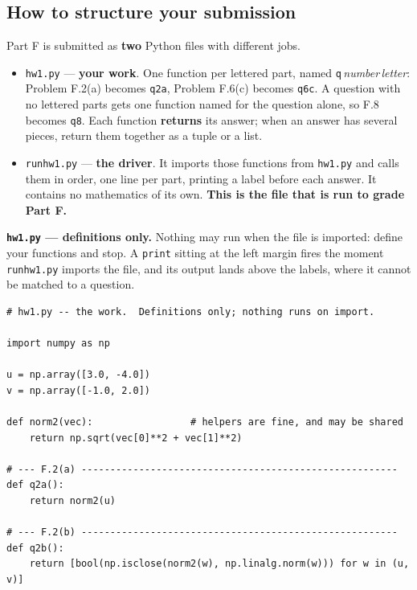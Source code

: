 \documentclass[11pt]{article}
\theoremstyle{definition}
\begin{document}
\subsection{How to structure your submission}

Part F is submitted as \textbf{two} Python files with different jobs.

\begin{itemize}[leftmargin=1.4em,itemsep=6pt,topsep=4pt]
  \item \texttt{hw1.py} --- \textbf{your work}. One function per lettered part,
        named \texttt{q}\,\emph{number}\,\emph{letter}: Problem F.2(a) becomes
        \texttt{q2a}, Problem F.6(c) becomes \texttt{q6c}. A question with no
        lettered parts gets one function named for the question alone, so F.8
        becomes \texttt{q8}. Each function \textbf{returns} its answer; when an
        answer has several pieces, return them together as a tuple or a list.
  \item \texttt{runhw1.py} --- \textbf{the driver}. It imports those functions
        from \texttt{hw1.py} and calls them in order, one line per part, printing
        a label before each answer. It contains no mathematics of its own.
        \textbf{This is the file that is run to grade Part F.}
\end{itemize}

\medskip
\noindent\textbf{\texttt{hw1.py} --- definitions only.} Nothing may run when the
file is imported: define your functions and stop. A \texttt{print} sitting at the
left margin fires the moment \texttt{runhw1.py} imports the file, and its output
lands above the labels, where it cannot be matched to a question.

\begin{lstlisting}
# hw1.py -- the work.  Definitions only; nothing runs on import.

import numpy as np

u = np.array([3.0, -4.0])
v = np.array([-1.0, 2.0])

def norm2(vec):                 # helpers are fine, and may be shared
    return np.sqrt(vec[0]**2 + vec[1]**2)

# --- F.2(a) -------------------------------------------------------
def q2a():
    return norm2(u)

# --- F.2(b) -------------------------------------------------------
def q2b():
    return [bool(np.isclose(norm2(w), np.linalg.norm(w))) for w in (u, v)]
\end{lstlisting}
\end{document}
